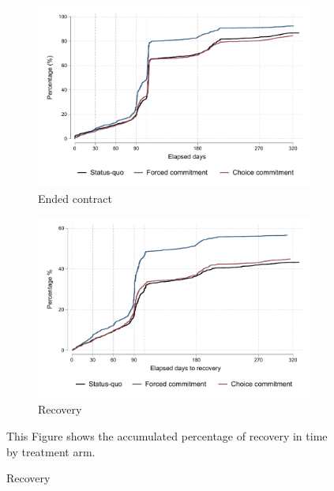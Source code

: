 \begin{figure}[H]
        \caption{Survival graph}
    \label{survival_graph}
    \begin{center}
   \begin{subfigure}{0.49\textwidth}
   \caption{Ended contract}
        \centering
        \includegraphics[width=\textwidth]{Figuras/survival_graph_ended.pdf}
    \end{subfigure} 
   \begin{subfigure}{0.49\textwidth}
   \caption{Recovery}
        \centering
        \includegraphics[width=\textwidth]{Figuras/survival_graph_unpledge.pdf}
    \end{subfigure}     
    \end{center}
     \scriptsize  This Figure shows the accumulated percentage of recovery in time by treatment arm. 
\end{figure}


